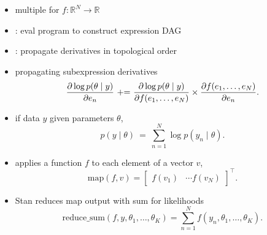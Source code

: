 \documentclass[10pt]{report}
\begin{document}
\begin{itemize}
\item {} multiple for $f: \mathbb{R}^N \rightarrow \mathbb{R}$
\item {}: eval program to construct expression DAG
\item {}: propagate derivatives in topological order
\vspace*{9pt}
\item {} propagating subexpression derivatives
\[
  \frac{\displaystyle \partial \log p(\theta \mid y)}{\displaystyle \partial e_n}
  \ {+}{=} \
  \frac{\displaystyle \partial \log p(\theta \mid y)}{\displaystyle \partial f(e_1, \ldots, e_N)}
  \times
  \frac{\displaystyle \partial f(e_1, \ldots, e_N)}{\displaystyle \partial e_n}.
\]
\vspace*{-9pt}
\end{itemize}

\begin{itemize}
\item if data $y$  given parameters $\theta$, 
  \[\textstyle
    p(y \mid \theta) \ = \ \sum_{n=1}^N \log p(y_n \mid \theta).
  \]
\item {} applies a function $f$ to each element of a vector
  $v$, 
  \[\textstyle
    \textrm{map}(f, v) = \begin{bmatrix} f(v_1) & \cdots
      f(v_N) \end{bmatrix}^{\top}.
  \]
\item Stan reduces map output with sum for likelihoods
  \[\textstyle
    \textrm{reduce\_sum}(f, y, \theta_1, \ldots, \theta_K) =
    \sum_{n=1}^N f(y_n, \theta_1, \ldots, \theta_K).
  \]
\end{itemize}

\end{document}
